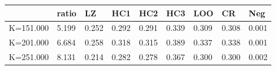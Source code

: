 \begin{table}[ht]
\centering
\begin{tabular}{rllllllll}
  \hline
 & ratio & LZ & HC1 & HC2 & HC3 & LOO & CR & Neg \\ 
  \hline
K=151.000 & 5.199 & 0.252 & 0.292 & 0.291 & 0.339 & 0.309 & 0.308 & 0.001 \\ 
  K=201.000 & 6.684 & 0.258 & 0.318 & 0.315 & 0.389 & 0.337 & 0.338 & 0.001 \\ 
  K=251.000 & 8.131 & 0.214 & 0.282 & 0.278 & 0.367 & 0.300 & 0.300 & 0.002 \\ 
   \hline
\end{tabular}
\end{table}
